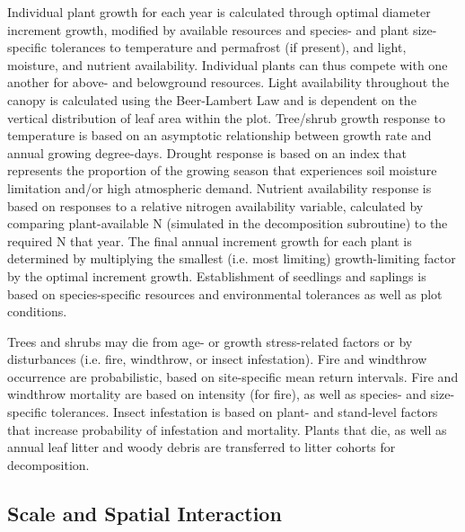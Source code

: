 \documentclass[a4paper, 12pt] {report}
\begin{document}
Individual plant growth for each year is calculated through optimal diameter increment growth, modified by available resources and species- and plant size-specific tolerances to temperature and permafrost (if present), and light, moisture, and nutrient availability. Individual plants can thus compete with one another for above- and belowground resources. Light availability throughout the canopy is calculated using the Beer-Lambert Law and is dependent on the vertical distribution of leaf area within the plot. Tree/shrub growth response to temperature is based on an asymptotic relationship between growth rate and annual growing degree-days. Drought response is based on an index that represents the proportion of the growing season that experiences soil moisture limitation and/or high atmospheric demand. Nutrient availability response is based on responses to a relative nitrogen availability variable, calculated by comparing plant-available N (simulated in the decomposition subroutine) to the required N that year. The final annual increment growth for each plant is determined by multiplying the smallest (i.e. most limiting) growth-limiting factor by the optimal increment growth. Establishment of seedlings and saplings is based on species-specific resources and environmental tolerances as well as plot conditions. 

Trees and shrubs may die from age- or growth stress-related factors or by disturbances (i.e. fire, windthrow, or insect infestation). Fire and windthrow occurrence are probabilistic, based on site-specific mean return intervals. Fire and windthrow mortality are based on intensity (for fire), as well as species- and size-specific tolerances. Insect infestation is based on plant- and stand-level factors that increase probability of infestation and mortality. Plants that die, as well as annual leaf litter and woody debris are transferred to litter cohorts for decomposition.

\subsection{Scale and Spatial Interaction} \label{scales}
\end{document}
